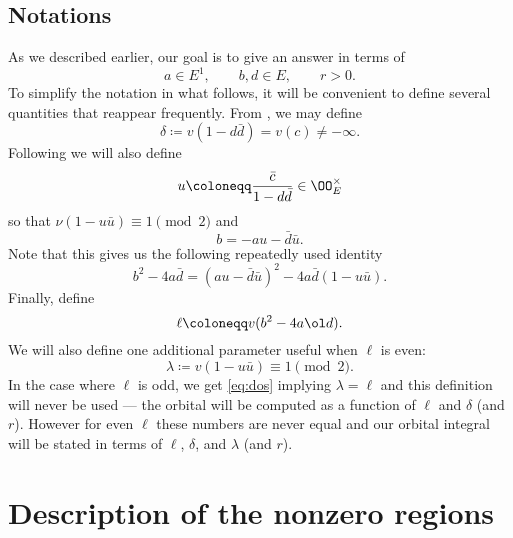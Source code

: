 \subsection{Notations}
As we described earlier, our goal is to give an answer in terms of
\[ a \in E^1, \qquad b, d \in E, \qquad r > 0. \]
To simplify the notation in what follows,
it will be convenient to define several quantities that reappear frequently.
From , we may define
\begin{equation}
  \delta \coloneqq v(1-d \bar d) = v(c) \neq -\infty.
  \label{eq:delta}
\end{equation}
Following \cite{ref:AFL} we will also define
\begin{equation}
  u \coloneqq \frac{\bar c}{1-d \bar d} \in \OO_E^\times
  \label{eq:u}
\end{equation}
so that $\nu(1-u \bar u) \equiv 1 \pmod 2$ and
\begin{equation}
  b = -au - \bar{d} \bar{u}.
  \label{eq:b}
\end{equation}
Note that this gives us the following repeatedly used identity
\begin{equation}
  b^2-4a\bar d = (au-\bar d \bar u)^2 - 4a\bar d(1-u\bar u).
  \label{eq:dos}
\end{equation}
Finally, define
\begin{equation}
  \ell \coloneqq v(b^2 - 4 a \ol d).
  \label{eq:ell}
\end{equation}
We will also define one additional parameter useful when $\ell$ is even:
\begin{equation}
  \lambda \coloneqq v(1-u \bar u) \equiv 1 \pmod 2.
  \label{eq:lambda}
\end{equation}
In the case where $\ell$ is odd, we get \eqref{eq:dos} implying $\lambda = \ell$
and this definition will never be used --- the orbital will be computed
as a function of $\ell$ and $\delta$ (and $r$).
However for even $\ell$ these numbers are never equal and our orbital
integral will be stated in terms of $\ell$, $\delta$, and $\lambda$ (and $r$).

\section{Description of the nonzero regions}
